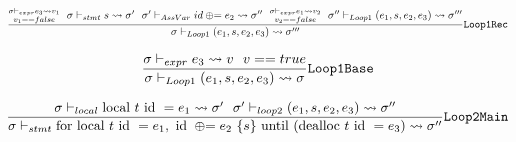 
\begin{equation} \label{eq:loop1Rec}
    \frac{\substack{\sigma \vdash_{expr} e_3 \leadsto v_1 \\
            v_1 == false} ~~
        \sigma \vdash_{stmt} s \leadsto \sigma' ~~
        \sigma' \vdash_{AssVar} id \oplus{\kern-5.0pt}= e_2 \leadsto \sigma'' ~~
        \substack{\sigma \vdash_{expr} e_1 \leadsto v_2 \\
            v_2 == false} ~~
        \sigma'' \vdash_{Loop1} (e_1, s, e_2, e_3) \leadsto \sigma'''}
    {\sigma \vdash_{Loop1} (e_1, s, e_2, e_3) \leadsto \sigma'''}
    \text{\texttt{Loop1Rec}}
\end{equation}

\begin{equation} \label{eq:loop1Base}
    \frac{\sigma \vdash_{expr} e_3 \leadsto v ~~
        v == true}
    {\sigma \vdash_{Loop1} (e_1, s, e_2, e_3) \leadsto \sigma}
    \text{\texttt{Loop1Base}}
\end{equation}

\begin{equation} \label{eq:loop2Main}
    \frac{\sigma \vdash_{local} \text{local } t \text{ id } = e_1 \leadsto \sigma' ~~
        \sigma' \vdash_{loop2} (e_1, s, e_2, e_3) \leadsto \sigma''}
    {\sigma \vdash_{stmt} \text{for local }t\text{ id }= e_1,\text{ id }\oplus{\kern-5.0pt}= e_2 ~\{s\} \text{ until (dealloc } t\text{ id }= e_3) \leadsto \sigma''}
    \text{\texttt{Loop2Main}}
\end{equation}


